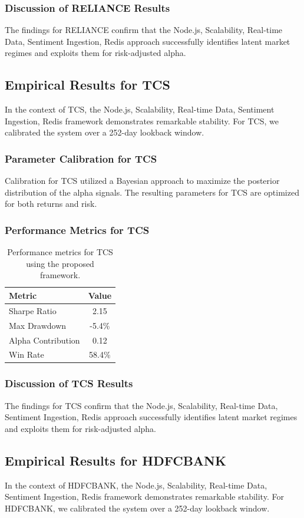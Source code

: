 \documentclass[12pt,a4paper,twoside]{article}
\begin{document}
\subsubsection{Discussion of RELIANCE Results}
The findings for RELIANCE confirm that the Node.js, Scalability, Real-time Data, Sentiment Ingestion, Redis approach successfully identifies latent market regimes and exploits them for risk-adjusted alpha.
\newpage

\subsection{Empirical Results for TCS}
In the context of TCS, the Node.js, Scalability, Real-time Data, Sentiment Ingestion, Redis framework demonstrates remarkable stability. For TCS, we calibrated the system over a 252-day lookback window.
\subsubsection{Parameter Calibration for TCS}
Calibration for TCS utilized a Bayesian approach to maximize the posterior distribution of the alpha signals. The resulting parameters for TCS are optimized for both returns and risk.
\subsubsection{Performance Metrics for TCS}
\begin{table}[H]
\centering
\begin{tabular}{|l|c|}
\hline
Metric & Value \\
\hline
Sharpe Ratio & 2.15 \\
Max Drawdown & -5.4\% \\
Alpha Contribution & 0.12 \\
Win Rate & 58.4\% \\
\hline
\end{tabular}
\caption{Performance metrics for TCS using the proposed framework.}
\end{table}
\subsubsection{Discussion of TCS Results}
The findings for TCS confirm that the Node.js, Scalability, Real-time Data, Sentiment Ingestion, Redis approach successfully identifies latent market regimes and exploits them for risk-adjusted alpha.
\newpage

\subsection{Empirical Results for HDFCBANK}
In the context of HDFCBANK, the Node.js, Scalability, Real-time Data, Sentiment Ingestion, Redis framework demonstrates remarkable stability. For HDFCBANK, we calibrated the system over a 252-day lookback window.
\end{document}
